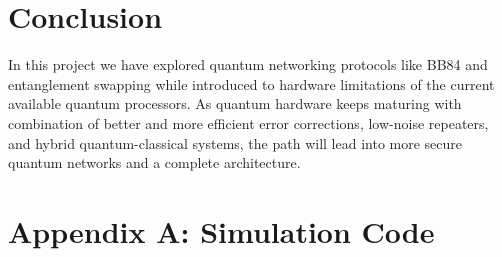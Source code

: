 \documentclass[12pt]{ieeetj}
\begin{document}
\section{Conclusion}

	In this project we have explored quantum networking protocols like BB84 and entanglement swapping while introduced to hardware 
	limitations of the current available quantum processors. 
	As quantum hardware keeps maturing with combination of better and more efficient error corrections, low-noise repeaters, 
	and hybrid quantum-classical systems, the path will lead into more secure quantum networks and a complete architecture.

\newpage


\newpage
\appendix

\section{Appendix A: Simulation Code }
\end{document}
